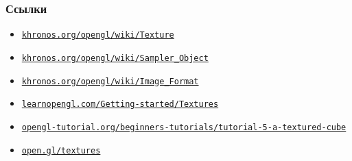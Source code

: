 \documentclass{beamer}
\begin{document}
\begin{frame}[fragile]
\frametitle{Ссылки}
\begin{itemize}
\item \href{https://www.khronos.org/opengl/wiki/Texture}{\nolinkurl{khronos.org/opengl/wiki/Texture}}
\item \href{https://www.khronos.org/opengl/wiki/Sampler_Object}{\nolinkurl{khronos.org/opengl/wiki/Sampler\_Object}}
\item \href{https://www.khronos.org/opengl/wiki/Image_Format}{\nolinkurl{khronos.org/opengl/wiki/Image\_Format}}
\item \href{https://learnopengl.com/Getting-started/Textures}{\nolinkurl{learnopengl.com/Getting-started/Textures}}
\item \href{http://www.opengl-tutorial.org/beginners-tutorials/tutorial-5-a-textured-cube}{\nolinkurl{opengl-tutorial.org/beginners-tutorials/tutorial-5-a-textured-cube}}
\item \href{https://open.gl/textures}{\nolinkurl{open.gl/textures}}
\end{itemize}
\end{frame}
\end{document}
